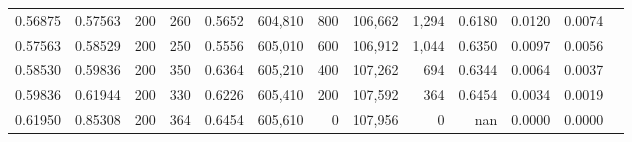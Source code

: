 \begin{tabular}{rrrrrrrrrrrrr}
0.56875 & 0.57563 &   200 & 260 &                                     0.5652 & 604,810 &     800 & 106,662 &   1,294 & 0.6180 & 0.0120 & 0.0074 \\
0.57563 & 0.58529 &   200 & 250 &                                     0.5556 & 605,010 &     600 & 106,912 &   1,044 & 0.6350 & 0.0097 & 0.0056 \\
0.58530 & 0.59836 &   200 & 350 &                                     0.6364 & 605,210 &     400 & 107,262 &     694 & 0.6344 & 0.0064 & 0.0037 \\
0.59836 & 0.61944 &   200 & 330 &                                     0.6226 & 605,410 &     200 & 107,592 &     364 & 0.6454 & 0.0034 & 0.0019 \\
0.61950 & 0.85308 &   200 & 364 &                                     0.6454 & 605,610 &       0 & 107,956 &       0 &    nan & 0.0000 & 0.0000 \\
\bottomrule
\end{tabular}
